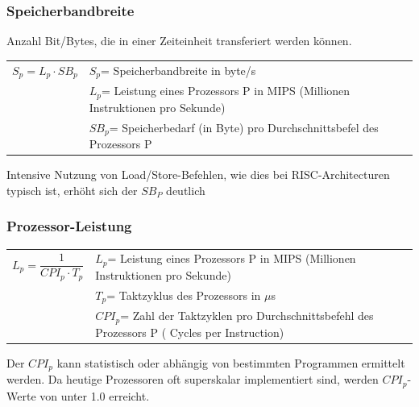 \subsubsection{Speicherbandbreite}
Anzahl Bit/Bytes, die in einer Zeiteinheit transferiert werden können.\newline
\begin{tabular}{cl}
    $ S_p = L_p \cdot SB_p $&$ S_p $= Speicherbandbreite in byte/s\\
    & $ L_p $= Leistung eines Prozessors P in MIPS (Millionen Instruktionen pro Sekunde)\\
    &$ SB_p $= Speicherbedarf (in Byte) pro Durchschnittsbefel des Prozessors P\\   
\end{tabular}
Intensive Nutzung von Load/Store-Befehlen, wie dies bei RISC-Architecturen typisch ist, erhöht sich der $ SB_P $ deutlich

\subsubsection{Prozessor-Leistung}
\begin{tabular}{cl}
    $ L_p = \dfrac{1}{CPI_p \cdot T_p} $ & $ L_p $= Leistung eines Prozessors P in MIPS (Millionen Instruktionen pro Sekunde)\\
    &$ T_p $= Taktzyklus des Prozessors in $ \mu $s\\
    &$ CPI_p $= Zahl der Taktzyklen pro Durchschnittsbefehl des Prozessors P ( Cycles per Instruction)\\   
\end{tabular}
Der $ CPI_p $ kann statistisch oder abhängig von bestimmten Programmen ermittelt werden. Da heutige Prozessoren oft superskalar implementiert sind, werden $ CPI_p $-Werte von unter 1.0 erreicht.

